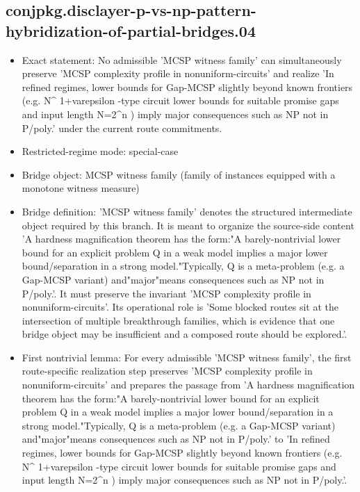 \documentclass[11pt]{article}
\begin{document}
\subsection*{conjpkg.disclayer-p-vs-np-pattern-hybridization-of-partial-bridges.04}
\begin{itemize}
\item Exact statement: No admissible 'MCSP witness family' can simultaneously preserve 'MCSP complexity profile in nonuniform-circuits' and realize 'In refined regimes, lower bounds for Gap-MCSP slightly beyond known frontiers (e.g. N\textasciicircum{} 1+varepsilon -type circuit lower bounds for suitable promise gaps and input length N=2\textasciicircum{}n ) imply major consequences such as NP not in P/poly.' under the current route commitments.
\item Restricted-regime mode: special-case
\item Bridge object: MCSP witness family (family of instances equipped with a monotone witness measure)
\item Bridge definition: 'MCSP witness family' denotes the structured intermediate object required by this branch. It is meant to organize the source-side content 'A hardness magnification theorem has the form:"A barely-nontrivial lower bound for an explicit problem Q in a weak model implies a major lower bound/separation in a strong model."Typically, Q is a meta-problem (e.g. a Gap-MCSP variant) and"major"means consequences such as NP not in P/poly.'. It must preserve the invariant 'MCSP complexity profile in nonuniform-circuits'. Its operational role is 'Some blocked routes sit at the intersection of multiple breakthrough families, which is evidence that one bridge object may be insufficient and a composed route should be explored.'.
\item First nontrivial lemma: For every admissible 'MCSP witness family', the first route-specific realization step preserves 'MCSP complexity profile in nonuniform-circuits' and prepares the passage from 'A hardness magnification theorem has the form:"A barely-nontrivial lower bound for an explicit problem Q in a weak model implies a major lower bound/separation in a strong model."Typically, Q is a meta-problem (e.g. a Gap-MCSP variant) and"major"means consequences such as NP not in P/poly.' to 'In refined regimes, lower bounds for Gap-MCSP slightly beyond known frontiers (e.g. N\textasciicircum{} 1+varepsilon -type circuit lower bounds for suitable promise gaps and input length N=2\textasciicircum{}n ) imply major consequences such as NP not in P/poly.'.

\end{itemize}
\end{document}
